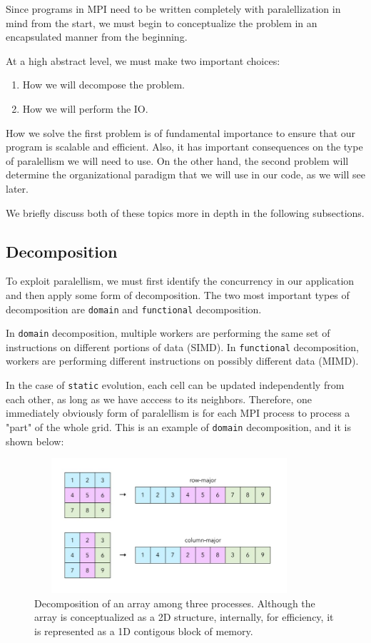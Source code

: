 \documentclass{report}
\begin{document}
Since programs in MPI need to be written completely with paralellization in mind 
from the start, we must begin to conceptualize the problem in an encapsulated 
manner from the beginning.

At a high abstract level, we must make two important choices: 

\begin{enumerate}
    \item How we will decompose the problem. 
    \item How we will perform the IO. 
\end{enumerate}

How we solve the first problem is of fundamental importance to ensure that our 
program is scalable and efficient. Also, it has important consequences on the 
type of paralellism we will need to use. 
On the other hand, the second problem will determine the organizational paradigm 
that we will use in our code, as we will see later.

We briefly discuss both of these topics more in depth in the following 
subsections.

\subsection{Decomposition}

To exploit paralellism, we must first identify the concurrency in our 
application and then apply some form of decomposition. The two most important 
types of decomposition are \texttt{domain} and \texttt{functional} decomposition. 

In \texttt{domain} decomposition, multiple workers are performing the same set of 
instructions on different portions of data (SIMD). In \texttt{functional} 
decomposition, workers are performing different instructions on possibly 
different data (MIMD). 
 
In the case of \texttt{static} evolution, each cell can be updated 
independently from each other, as long as we have acccess to its neighbors. 
Therefore, one immediately obviously form of paralellism is for each MPI 
process to process a "part" of the whole grid. This is an example of \texttt{domain}
decomposition, and it is shown below:

\begin{figure}[H]
\centering
\includegraphics[width=10cm, height=5cm]{./other_images/arraydecomposition.jpg}
\caption{\label{fig:decomposition} Decomposition of an array among three processes. 
Although the array is conceptualized as a 2D structure, internally, for efficiency, 
it is represented as a 1D contigous block of memory.}
\end{figure}
\end{document}
